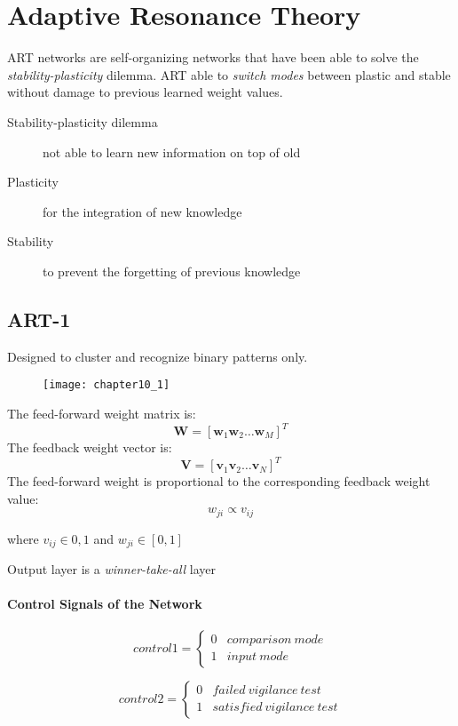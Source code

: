\chapter{Adaptive Resonance Theory}
ART networks are self-organizing networks that have been able to solve the \emph{stability-plasticity} dilemma. ART able to \emph{switch modes} between plastic and stable without damage to previous learned weight values.

\begin{description}
\item[Stability-plasticity dilemma] not able to learn new information on top of old
\item[Plasticity] for the integration of new knowledge
\item[Stability] to prevent the forgetting of previous knowledge
\end{description}

\section{ART-1}
Designed to cluster and recognize binary patterns only.
\begin{figure}[!h]
\centering
\texttt{[image: chapter10\_1]}
\end{figure}

\noindent The feed-forward weight matrix is:
$$\mathbf{W} = [\mathbf{w}_1 \mathbf{w}_2 \ldots \mathbf{w}_M]^{T}$$
The feedback weight vector is:
$$\mathbf{V} = [\mathbf{v}_1 \mathbf{v}_2 \ldots \mathbf{v}_N]^{T}$$
The feed-forward weight is proportional to the corresponding feedback weight value:
$$w_{ji} \propto v_{ij}$$
\begin{center} where $v_{ij} \in {0,1}$ and $w_{ji} \in [0,1]$\end{center}
Output layer is a \emph{winner-take-all} layer

\subsubsection{Control Signals of the Network}
$$
control1 = 
\begin{cases}
0 & comparison\ mode \\
1 & input\ mode
\end{cases}
$$

$$
control2 = 
\begin{cases}
0 & failed\ vigilance\ test \\
1 & satisfied\ vigilance\ test
\end{cases}
$$


